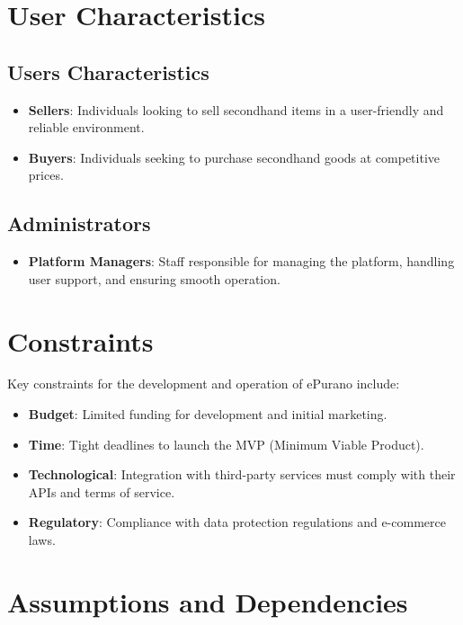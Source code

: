 \section{User Characteristics}

\subsection{Users Characteristics}

\begin{itemize}
    \item \textbf{Sellers}: Individuals looking to sell secondhand items in a user-friendly and reliable environment.
    \item \textbf{Buyers}: Individuals seeking to purchase secondhand goods at competitive prices.
\end{itemize}

\subsection{Administrators}

\begin{itemize}
    \item \textbf{Platform Managers}: Staff responsible for managing the platform, handling user support, and ensuring smooth operation.
\end{itemize}

\section{Constraints}

Key constraints for the development and operation of ePurano include:

\begin{itemize}
    \item \textbf{Budget}: Limited funding for development and initial marketing.
    \item \textbf{Time}: Tight deadlines to launch the MVP (Minimum Viable Product).
    \item \textbf{Technological}: Integration with third-party services must comply with their APIs and terms of service.
    \item \textbf{Regulatory}: Compliance with data protection regulations and e-commerce laws.
\end{itemize}

\section{Assumptions and Dependencies}

